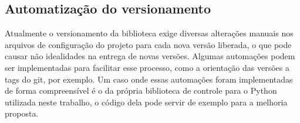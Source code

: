 \subsection{Automatização do versionamento}
Atualmente o versionamento da biblioteca exige diversas alterações manuais nos arquivos de configuração do projeto para
cada nova versão liberada, o que pode causar não idealidades na entrega de novas versões.
Algumas automações podem ser implementadas para facilitar esse processo, como a orientação das versões a tags do git,
por exemplo.
Um caso onde essas automações foram implementadas de forma compreensível é o da própria biblioteca de controle para o
Python utilizada neste trabalho, o código dela pode servir de exemplo para a melhoria proposta.
